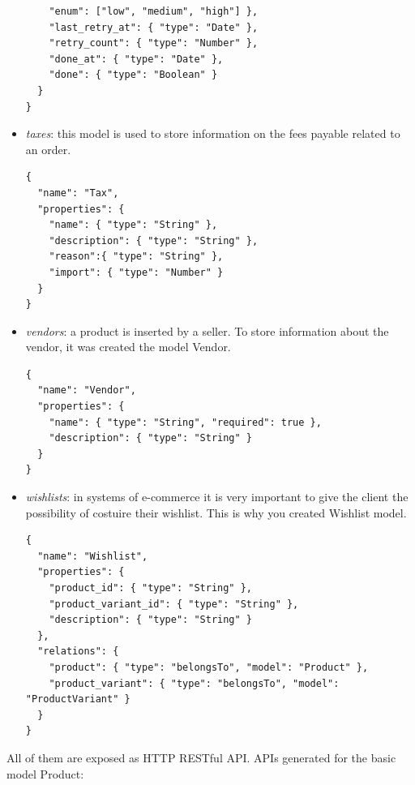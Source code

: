 \begin{itemize}
\begin{lstlisting}
    "enum": ["low", "medium", "high"] },
    "last_retry_at": { "type": "Date" },
    "retry_count": { "type": "Number" },
    "done_at": { "type": "Date" },
    "done": { "type": "Boolean" }
  }
}
\end{lstlisting}
\item \emph{taxes}: this model is used to store information on the fees payable related to an order.
\begin{lstlisting}
{
  "name": "Tax",
  "properties": {
    "name": { "type": "String" },
    "description": { "type": "String" },
    "reason":{ "type": "String" },
    "import": { "type": "Number" }
  }
}
\end{lstlisting}
\item \emph{vendors}: a product is inserted by a seller. To store information about the vendor, it was created the model Vendor.
\begin{lstlisting}
{
  "name": "Vendor",
  "properties": {
    "name": { "type": "String", "required": true },
    "description": { "type": "String" }
  }
}
\end{lstlisting}
\item \emph{wishlists}: in systems of e-commerce it is very important to give the client the possibility of costuire their wishlist. This is why you created Wishlist model.
\begin{lstlisting}
{
  "name": "Wishlist",
  "properties": {
    "product_id": { "type": "String" },
    "product_variant_id": { "type": "String" },
    "description": { "type": "String" }
  },
  "relations": {
    "product": { "type": "belongsTo", "model": "Product" },
    "product_variant": { "type": "belongsTo", "model": "ProductVariant" }
  }
}
\end{lstlisting}
\end{itemize}
All of them are exposed as HTTP RESTful API. APIs generated for the basic model Product:
